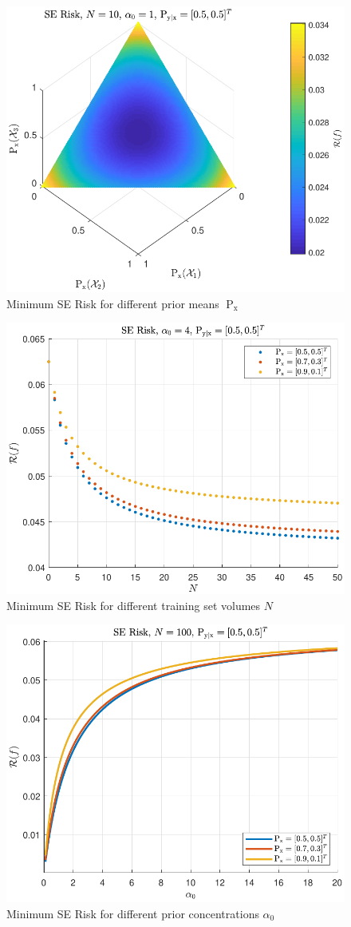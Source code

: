 \documentclass[12pt]{report}
\DeclareMathOperator{\xrm}{\mathrm{x}}
\DeclareMathOperator{\Prm}{\mathrm{P}}
\begin{document}
\begin{figure}
\centering
\includegraphics[width=0.7\linewidth]{Risk_SE_Dir_IO_Px_N_10_a0_1.pdf}
\caption{Minimum SE Risk for different prior means $\Prm_{\xrm}$}
\label{fig:Risk_SE_Dir_IO_Px_N_10_a0_1}
\end{figure}

\begin{figure}
\centering
\includegraphics[width=0.7\linewidth]{Risk_SE_Dir_IO_N_leg_Px.pdf}
\caption{Minimum SE Risk for different training set volumes $N$}
\label{fig:Risk_SE_Dir_IO_N_leg_Px}
\end{figure}

\begin{figure}
\centering
\includegraphics[width=0.7\linewidth]{Risk_SE_Dir_IO_a0_leg_Px.pdf}
\caption{Minimum SE Risk for different prior concentrations $\alpha_0$}
\label{fig:Risk_SE_Dir_IO_a0_leg_Px}
\end{figure}
\end{document}
